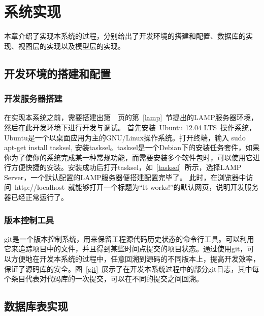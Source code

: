 
\chapter{系统实现}

本章介绍了实现本系统的过程，分别给出了开发环境的搭建和配置、数据库的实现、视图层的实现以及模型层的实现。

\section{开发环境的搭建和配置}

\subsection{开发服务器搭建}

在实现本系统之前，需要搭建出第~\pageref{lamp}~页的第~\ref{lamp}~节提出的LAMP服务器环境，然后在此开发环境下进行开发与调试。
首先安装~Ubuntu 12.04 LTS~操作系统，Ubuntu是一个以桌面应用为主的GNU/Linux操作系统。打开终端，输入
sudo apt-get install tasksel, 安装tasksel。tasksel是一个Debian下的安装任务套件，如果你为了使你的系统完成某一种常规功能，而需要安装多个软件包时，可以使用它进行方便快捷的安装。安装成功后打开tasksel，如~\ref{tasksel}~所示，选择LAMP Server，一个默认配置的LAMP服务器便搭建配置完毕了。
此时，在浏览器中访问~http://localhost~就能够打开一个标题为“It works!”的默认网页，说明开发服务器已经正常运行了。 


\subsection{版本控制工具}
git是一个版本控制系统，用来保留工程源代码历史状态的命令行工具。可以利用它来追踪项目中的文件，并且得到某些时间点提交的项目状态。通过使用git，可以方便地在开发本系统的过程中，任意回溯到源码的不同版本上，提高开发效率，保证了源码库的安全。图~\ref{git}~展示了在开发本系统过程中的部分git日志，其中每个条目代表对代码库的一次提交，可以在不同的提交之间回溯。
\section{数据库表实现}
